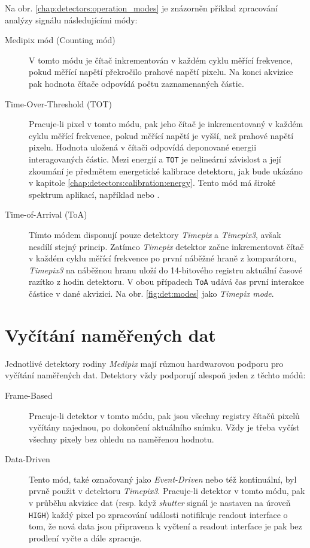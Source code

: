 Na obr. \ref{chap:detectors:operation_modes} je znázorněn příklad zpracování analýzy signálu následujícími módy:
\begin{description}
    \item[Medipix mód (Counting mód)] V tomto módu je čítač inkrementován v každém cyklu měřící frekvence, pokud měřící napětí překročilo prahové napětí pixelu. Na konci akvizice pak hodnota čítače odpovídá počtu zaznamenaných částic.
    \item[Time-Over-Threshold (TOT)] Pracuje-li pixel v tomto módu, pak jeho čítač je inkrementovaný v každém cyklu měřící frekvence, pokud měřící napětí je vyšší, než prahové napětí pixelu. Hodnota uložená v čítači odpovídá deponované energii interagovaných částic. Mezi energií a \texttt{TOT} je nelineární závislost a její zkoumání je předmětem energetické kalibrace detektoru, jak bude ukázáno v kapitole \ref{chap:detectors:calibration:energy}. Tento mód má široké spektrum aplikací, například \cite{tot_app_counting} nebo \cite{tpx_app_radiotherapy}.
    \item[Time-of-Arrival (ToA)] Tímto módem disponují pouze detektory \textit{Timepix} a \textit{Timepix3}, avšak nesdílí stejný princip. Zatímco \textit{Timepix} detektor začne inkrementovat čítač v každém cyklu měřící frekvence po první náběžné hraně z komparátoru, \textit{Timepix3} na náběžnou hranu uloží do 14-bitového registru aktuální časové razítko z hodin detektoru. V obou případech \texttt{ToA} udává čas první interakce částice v dané akvizici. Na obr. \ref{fig:det:modes} jako \textit{Timepix mode}.
\end{description}

\section{Vyčítání naměřených dat}\label{chap:detectors:readout}
Jednotlivé detektory rodiny \textit{Medipix} mají různou hardwarovou podporu pro vyčítání naměřených dat. Detektory vždy podporují alespoň jeden z těchto módů:
\begin{description}
	\item[Frame-Based] Pracuje-li detektor v tomto módu, pak jsou všechny registry čítačů pixelů vyčítány najednou, po dokončení aktuálního snímku. Vždy je třeba vyčíst všechny pixely bez ohledu na naměřenou hodnotu.
	\item[Data-Driven] Tento mód, také označovaný jako \textit{Event-Driven} nebo též kontinuální, byl prvně použit v detektoru \textit{Timepix3}. Pracuje-li detektor v tomto módu, pak v průběhu akvizice dat (resp. když \textit{shutter} signál je nastaven na úroveň \texttt{HIGH}) každý pixel po zpracování události notifikuje readout interface o tom, že nová data jsou připravena k vyčtení a readout interface je pak bez prodlení vyčte a dále zpracuje.
\end{description}

